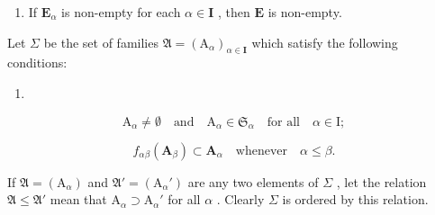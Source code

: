 \begin{enumerate}
\def\labelenumi{(\alph{enumi})}
\setcounter{enumi}{1}
\tightlist
\item
  If \(\mathbf{E}_{\alpha}\) is non-empty for each \(\alpha \in \mathbf{I}\) , then \(\mathbf{E}\) is non-empty.
\end{enumerate}

Let \(\Sigma\) be the set of families \(\mathfrak{A} = (\mathrm{A}_{\alpha})_{\alpha \in \mathbf{I}}\) which satisfy the following conditions:

\begin{enumerate}
\def\labelenumi{(\arabic{enumi})}
\setcounter{enumi}{19}
\tightlist
\item
\end{enumerate}

\[
\mathrm{A} _ {\alpha} \neq \emptyset \quad \text{and} \quad \mathrm{A} _ {\alpha} \in \mathfrak {S} _ {\alpha} \quad \text{for all} \quad \alpha \in \mathrm{I};\tag{21}
\]

\[
f _ {\alpha \beta} (\mathbf {A} _ {\beta}) \subset \mathbf {A} _ {\alpha} \quad \text{whenever} \quad \alpha \leqslant \beta .
\]

If \(\mathfrak{A} = (\mathrm{A}_{\alpha})\) and \(\mathfrak{A}' = (\mathrm{A}_{\alpha}')\) are any two elements of \(\Sigma\) , let the relation \(\mathfrak{A} \leqslant \mathfrak{A}'\) mean that \(\mathrm{A}_{\alpha} \supset \mathrm{A}_{\alpha}'\) for all \(\alpha\) . Clearly \(\Sigma\) is ordered by this relation.

